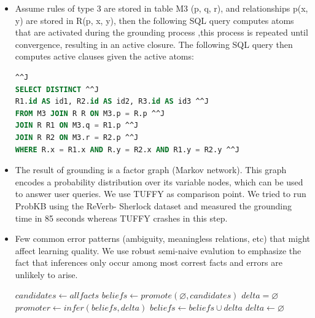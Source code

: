\documentclass[landscape,final,a0paper,fontscale=0.285]{baposter}
\begin{document}
\begin{poster}
{\begin{itemize}
     \item Assume rules of type 3 are stored in table M3 (p, q, r), and relationships p(x, y) are stored in R(p, x, y), then the
following SQL query computes atoms that are activated during the grounding process ,this process is repeated until convergence, resulting
in an active closure. The following SQL query then
computes active clauses given the active atoms:

  
 \begin{lstlisting}[language=SQL]^^J
SELECT DISTINCT ^^J
R1.id AS id1, R2.id AS id2, R3.id AS id3 ^^J
FROM M3 JOIN R R ON M3.p = R.p ^^J
JOIN R R1 ON M3.q = R1.p ^^J
JOIN R R2 ON M3.r = R2.p ^^J
WHERE R.x = R1.x AND R.y = R2.x AND R1.y = R2.y ^^J 
\end{lstlisting}




   \item The result of grounding is a factor graph (Markov network). This graph encodes a probability distribution
over its variable nodes, which can be used to answer
user queries. We use TUFFY as comparison point. We tried to run ProbKB using the ReVerb-
Sherlock dataset and measured the grounding time in 85 seconds whereas TUFFY crashes in this step.


   \end{itemize}


}
 {
  \newcommand{\compactlist}{\setlength{\itemsep}{0pt} \setlength{\parskip}{0pt} \setlength{\leftskip}{-1em}}
\begin{itemize}\compactlist
\item Few common error patterns (ambiguity, meaningless relations, etc) that might affect learning quality. We use robust semi-naive evalution to emphasize the fact that inferences only occur among most correst facts and errors are unlikely to arise.
    
\begin{algorithmic}
\State $candidates \gets all facts $
\State $beliefs \gets promote( \varnothing ,candidates) $
\State $delta = \varnothing $
\Repeat 
\State $promoter  \gets infer(beliefs,delta) $
\State $beliefs  \gets beliefs \cup delta $
\State $delta \gets \varnothing $
\Until 

\end{algorithmic}
  


\end{itemize}}
\end{poster}
\end{document}
